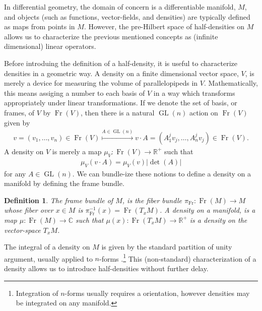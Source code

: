 \documentclass[12pt]{amsart}
\newtheorem{defn}{Definition}
\DeclareMathOperator{\GL}{GL}
\DeclareMathOperator{\Fr}{Fr}
\begin{document}
In differential geometry, the domain of concern is
a differentiable manifold, $M$, and objects (such as
functions, vector-fields, and densities) are typically defined
as maps from points in $M$.
However, the pre-Hilbert space
of half-densities on $M$ allows us to characterize the previous
mentioned concepts as (infinite dimensional) linear operators.

Before introduing the definition of a half-density, it is useful
to characterize densities in a geometric way.
A density on a finite dimensional vector space, $V$,
is merely a device for measuring the volume of parallelopipeds in $V$.
Mathematically, this means assiging a number to each basis of $V$
in a way which transforms appropriately under linear transformations.
If we denote the set of basis, or frames, of $V$ by $\Fr(V)$,
 then there is a natural $\GL(n)$ action on $\Fr(V)$ given by
 \begin{align*}
  v = (v_1,\dots,v_n) \in \Fr(V) \stackrel{A \in \GL(n)}{\mapsto} v \cdot A = (A_1^j v_j, \dots, A_n^j v_j) \in \Fr(V).
 \end{align*}
A density on $V$ is merely a map $\mu_V: \Fr(V) \to \mathbb{R}^+$ such that
\begin{align*}
  \mu_V( v \cdot A) = \mu_V(v) | \det(A) |
\end{align*}
for any $A \in \GL(n)$.
We can bundle-ize these notions to define a density on a manifold by defining the frame bundle.
\begin{defn}
  The \emph{frame bundle} of $M$, is the fiber bundle $\pi_{\Fr}:\Fr(M) \to M$ whose fiber over $x \in M$ is $\pi_{\Fr}^{-1}(x) = \Fr( T_x M)$.
A \emph{density} on a manifold, is a map $\mu:\Fr(M) \to \mathbb{C}$ such that $\mu(x): \Fr(T_xM) \to \mathbb{R}^+$ is a density on the vector-space $T_xM$.
\end{defn}
 The integral of a density on $M$ is given by the standard partition of unity argument, usually applied to $n$-forms \cite[Chapter 14]{Lee2006}.\footnote{Integration of $n$-forms usually requires a orientation, however densities may be integrated on any manifold.}
This (non-standard) characterization of a density allows us to introduce half-densities without further delay.
\end{document}
